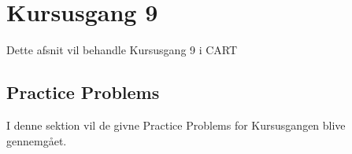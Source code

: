 \chapter{Kursusgang 9}
Dette afsnit vil behandle Kursusgang 9 i CART

\section{Practice Problems}
I denne sektion vil de givne Practice Problems for Kursusgangen blive gennemgået.
